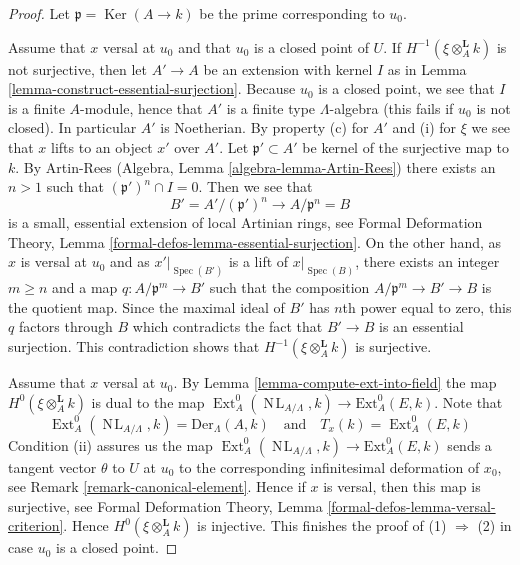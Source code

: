 \documentclass[10pt,a4paper]{amsart}
\theoremstyle{plain}
\theoremstyle{definition}
\theoremstyle{remark}
\numberwithin{equation}{subsection}
\def\Spec{\mathop{\mathrm{Spec}}}
\def\Ext{\mathop{\mathrm{Ext}}\nolimits}
\def\NL{\mathop{N\!L}\nolimits}
\def\Ker{\mathop{\mathrm{Ker}}}
\begin{document}
\begin{proof}
Let $\mathfrak p = \Ker(A \to k)$ be the prime corresponding to $u_0$.

\medskip\noindent
Assume that $x$ versal at $u_0$ and that $u_0$ is a closed point of $U$.
If $H^{-1}(\xi \otimes_A^{\mathbf{L}} k)$ is not surjective, then
let $A' \to A$ be an extension with kernel $I$ as in
Lemma \ref{lemma-construct-essential-surjection}.
Because $u_0$ is a closed point, we see that $I$ is a finite $A$-module,
hence that $A'$ is a finite type $\Lambda$-algebra (this fails if
$u_0$ is not closed). In particular $A'$ is Noetherian.
By property (c) for $A'$ and (i) for $\xi$ we see that $x$ lifts to
an object $x'$ over $A'$.
Let $\mathfrak p' \subset A'$ be kernel of the surjective map to $k$.
By Artin-Rees (Algebra, Lemma \ref{algebra-lemma-Artin-Rees})
there exists an $n > 1$ such that $(\mathfrak p')^n \cap I = 0$.
Then we see that
$$
B' = A'/(\mathfrak p')^n \longrightarrow A/\mathfrak p^n = B
$$
is a small, essential extension of local Artinian rings, see
Formal Deformation Theory, Lemma
\ref{formal-defos-lemma-essential-surjection}.
On the other hand, as $x$ is versal at $u_0$ and as $x'|_{\Spec(B')}$
is a lift of $x|_{\Spec(B)}$, there exists an integer
$m \geq n$ and a map $q : A/\mathfrak p^m \to B'$
such that the composition
$A/\mathfrak p^m \to B' \to B$ is the quotient map.
Since the maximal ideal of $B'$ has $n$th power equal to zero, this
$q$ factors through $B$ which contradicts the fact that $B' \to B$ is an
essential surjection. This contradiction shows that
$H^{-1}(\xi \otimes_A^{\mathbf{L}} k)$
is surjective.

\medskip\noindent
Assume that $x$ versal at $u_0$. By Lemma \ref{lemma-compute-ext-into-field}
the map $H^0(\xi \otimes_A^{\mathbf{L}} k)$ is dual to the map
$\Ext^0_A(\NL_{A/\Lambda}, k) \to \text{Ext}^0_A(E, k)$. Note that
$$
\Ext^0_A(\NL_{A/\Lambda}, k) = \text{Der}_\Lambda(A, k)
\quad\text{and}\quad
T_x(k) = \Ext^0_A(E, k)
$$
Condition (ii) assures us the map
$\Ext^0_A(\NL_{A/\Lambda}, k) \to \text{Ext}^0_A(E, k)$
sends a tangent vector $\theta$ to $U$ at $u_0$ to the corresponding
infinitesimal deformation of $x_0$, see Remark \ref{remark-canonical-element}.
Hence if $x$ is versal, then this map is surjective, see
Formal Deformation Theory, Lemma \ref{formal-defos-lemma-versal-criterion}.
Hence $H^0(\xi \otimes_A^{\mathbf{L}} k)$ is injective.
This finishes the proof of (1) $\Rightarrow$ (2) in case $u_0$ is a
closed point.


\end{proof}
\end{document}
